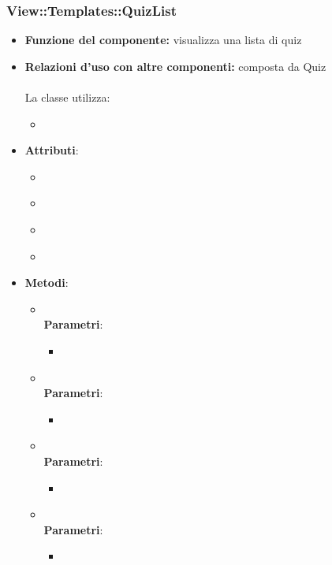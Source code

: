 \subsubsection{View::Templates::QuizList}
\begin{itemize}
\item\textbf{Funzione del componente:} visualizza una lista di quiz
				\item\textbf{Relazioni d'uso con altre componenti:} composta da Quiz\\ \\
La classe utilizza:
	\begin{itemize}
		\item
	\end{itemize}
\item\textbf{Attributi}:
	\begin{itemize}
		\item\code{}\\
		\item\code{}\\
		\item\code{}\\
		\item\code{}\\
	\end{itemize}
\item\textbf{Metodi}:
	\begin{itemize}
		\item\code{}\\
	\textbf{Parametri}:
			\begin{itemize}
				\item\code{}\\
			\end{itemize}
		\item\code{}\\
		\textbf{Parametri}:
			\begin{itemize}
				\item\code{}\\
			\end{itemize}
		\item\code{}\\
		\textbf{Parametri}:
			\begin{itemize}
				\item\code{}\\
			\end{itemize}
		\item\code{}\\
		\textbf{Parametri}:
			\begin{itemize}
				\item\code{}\\
			\end{itemize}
	\end{itemize}
\end{itemize}


